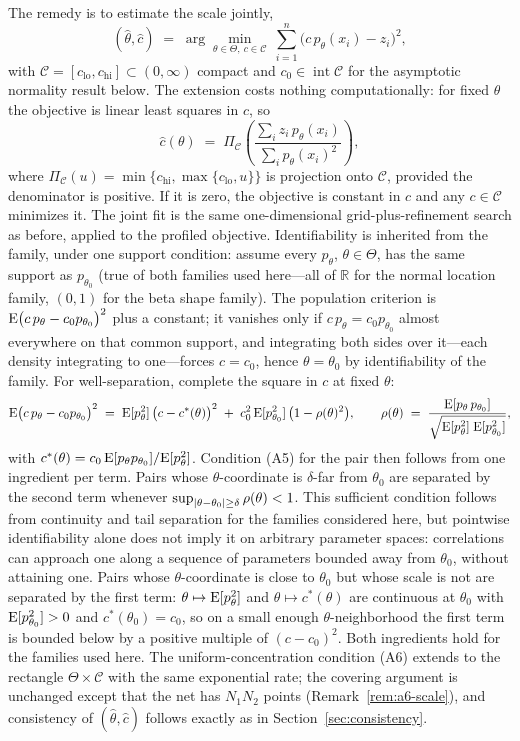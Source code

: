 The remedy is to estimate the scale jointly,
\[
(\hat\theta,\hat c)\;=\;\arg\min_{\theta\in\Theta,\ c\in\mathcal{C}}\ \sum_{i=1}^{n}\big(c\,p_{\theta}(x_i)-z_i\big)^{2},
\]
with $\mathcal{C}=[c_{\mathrm{lo}},c_{\mathrm{hi}}]\subset(0,\infty)$ compact and $c_0\in\operatorname{int}\mathcal{C}$ for the asymptotic normality result below. The extension costs nothing computationally: for fixed $\theta$ the objective is linear least squares in $c$, so
\[
\hat c(\theta)\;=\;\Pi_{\mathcal{C}}\!\left(\frac{\sum_i z_i\,p_{\theta}(x_i)}{\sum_i p_{\theta}(x_i)^{2}}\right),
\]
where $\Pi_{\mathcal{C}}(u)=\min\{c_{\mathrm{hi}},\max\{c_{\mathrm{lo}},u\}\}$ is projection onto $\mathcal{C}$, provided the denominator is positive. If it is zero, the objective is constant in $c$ and any $c\in\mathcal{C}$ minimizes it. The joint fit is the same one-dimensional grid-plus-refinement search as before, applied to the profiled objective. Identifiability is inherited from the family, under one support condition: assume every $p_{\theta}$, $\theta\in\Theta$, has the same support as $p_{\theta_{0}}$ (true of both families used here---all of $\mathbb{R}$ for the normal location family, $(0,1)$ for the beta shape family). The population criterion is $\mathrm{E}\big(c\,p_{\theta}-c_{0}p_{\theta_{0}}\big)^{2}$ plus a constant; it vanishes only if $c\,p_{\theta}=c_{0}p_{\theta_{0}}$ almost everywhere on that common support, and integrating both sides over it---each density integrating to one---forces $c=c_{0}$, hence $\theta=\theta_{0}$ by identifiability of the family. For well-separation, complete the square in $c$ at fixed $\theta$:
\[
\mathrm{E}\big(c\,p_{\theta}-c_{0}p_{\theta_{0}}\big)^{2}
\;=\;\mathrm{E}[p_{\theta}^{2}]\,\big(c-c^{*}(\theta)\big)^{2}
\;+\;c_{0}^{2}\,\mathrm{E}[p_{\theta_{0}}^{2}]\,\big(1-\rho(\theta)^{2}\big),
\qquad
\rho(\theta)\;=\;\frac{\mathrm{E}[p_{\theta}\,p_{\theta_{0}}]}{\sqrt{\mathrm{E}[p_{\theta}^{2}]\;\mathrm{E}[p_{\theta_{0}}^{2}]}},
\]
with $c^{*}(\theta)=c_{0}\,\mathrm{E}[p_{\theta}p_{\theta_{0}}]/\mathrm{E}[p_{\theta}^{2}]$. Condition (A5) for the pair then follows from one ingredient per term. Pairs whose $\theta$-coordinate is $\delta$-far from $\theta_{0}$ are separated by the second term whenever $\sup_{\lvert\theta-\theta_{0}\rvert\ge\delta}\rho(\theta)<1$. This sufficient condition follows from continuity and tail separation for the families considered here, but pointwise identifiability alone does not imply it on arbitrary parameter spaces: correlations can approach one along a sequence of parameters bounded away from $\theta_0$, without attaining one. Pairs whose $\theta$-coordinate is close to $\theta_{0}$ but whose scale is not are separated by the first term: $\theta\mapsto\mathrm{E}[p_{\theta}^{2}]$ and $\theta\mapsto c^{*}(\theta)$ are continuous at $\theta_{0}$ with $\mathrm{E}[p_{\theta_{0}}^{2}]>0$ and $c^{*}(\theta_{0})=c_{0}$, so on a small enough $\theta$-neighborhood the first term is bounded below by a positive multiple of $(c-c_{0})^{2}$. Both ingredients hold for the families used here. The uniform-concentration condition (A6) extends to the rectangle $\Theta\times\mathcal{C}$ with the same exponential rate; the covering argument is unchanged except that the net has $N_{1}N_{2}$ points (Remark~\ref{rem:a6-scale}), and consistency of $(\hat\theta,\hat c)$ follows exactly as in Section~\ref{sec:consistency}.

